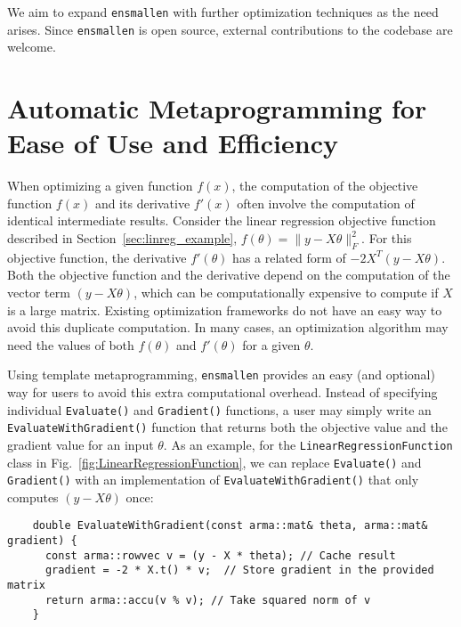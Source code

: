 \documentclass{article}
\begin{document}
We aim to expand {\tt ensmallen} with further optimization techniques
as the need arises.  Since {\tt ensmallen} is open source,
external contributions to the codebase are welcome.

\vspace*{-0.3em}
\section{Automatic Metaprogramming for Ease of Use and Efficiency}
\vspace*{-0.5em}

When optimizing a given function $f(x)$, the computation of
the objective function $f(x)$ and its derivative $f'(x)$ often involve the
computation of identical intermediate results.  Consider the linear regression
objective function described
in Section~\ref{sec:linreg_example}, $f(\theta) = \| y - X\theta \|_F^2$.
For this objective function, the derivative $f'(\theta)$ has a related form of
$-2 X^T (y -X \theta)$.  Both the objective function and the derivative 
depend on the computation of the vector term $(y - X \theta)$,
which can be computationally expensive to compute if $X$ is a large matrix.
Existing optimization frameworks do not have an easy way to avoid
this duplicate computation. In many cases, an optimization algorithm
may need the values of both $f(\theta)$ and $f'(\theta)$ for a given $\theta$.

Using template metaprogramming, {\tt ensmallen} provides an easy (and
optional) way for users to avoid this extra computational overhead.  Instead of
specifying individual {\tt Evaluate()} and {\tt Gradient()} functions, a user
may simply write an {\tt EvaluateWithGradient()} function that returns both the
objective value and the gradient value for an input $\theta$.  As an example,
for the 
\texttt{LinearRegressionFunction} class in Fig.~\ref{fig:LinearRegressionFunction},
we can replace {\tt Evaluate()} and {\tt Gradient()}
with an implementation of {\tt EvaluateWithGradient()}
that only computes $(y - X \theta)$ once:

\vspace*{-0.5em}
\begin{verbatim}
    double EvaluateWithGradient(const arma::mat& theta, arma::mat& gradient) {
      const arma::rowvec v = (y - X * theta); // Cache result
      gradient = -2 * X.t() * v;  // Store gradient in the provided matrix
      return arma::accu(v % v); // Take squared norm of v
    }
\end{verbatim}
\vspace*{-0.5em}
\end{document}
